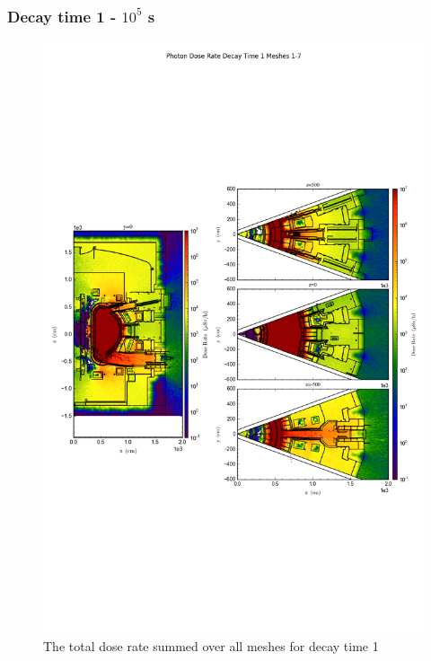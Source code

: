 \documentclass[12pt]{article}
\begin{document}
\subsubsection{Decay time 1 - $10^5$ s}
\begin{figure}[ht!]
\centering
\includegraphics[trim={0cm 9cm 0cm 10cm},clip,scale=0.75]{../plots/final_model/Photon_Dose_Rate_Decay_Time_1_Meshes_1-7.png}
\caption{The total dose rate summed over all meshes for decay time 1}
\label{fig:photons_dc1_no4bc_total}
\end{figure}
\end{document}
